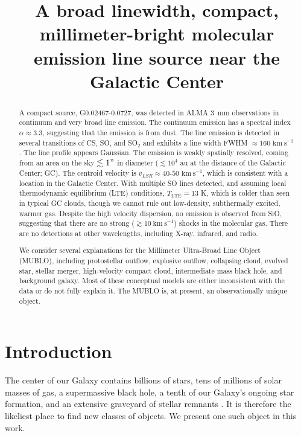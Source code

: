 \documentclass[]{aastex631}
\newcommand{\kms}{\ensuremath{\mathrm{km~s}^{-1}}\xspace}
\newcommand{\threemm}{3~mm\xspace}
\begin{document}
\title{A broad linewidth, compact, millimeter-bright molecular emission line source near the Galactic Center}


\begin{abstract}
A compact source, G0.02467-0.0727, was detected in ALMA \threemm observations in continuum and very broad line emission.
The continuum emission has a spectral index $\alpha\approx3.3$, suggesting that the emission is from dust.
The line emission is detected in several transitions of CS, SO, and SO$_2$ and exhibits a line width FWHM $\approx160$ \kms.
The line profile appears Gaussian.
The emission is weakly spatially resolved, coming from an area on the sky $\lesssim1"$ in diameter ($\lesssim10^4$ au at the distance of the Galactic Center; GC).
The centroid velocity is $v_{LSR}\approx40$-$50$ \kms, which is consistent with a location in the Galactic Center.
With multiple SO lines detected, and assuming local thermodynamic equilibrium (LTE) conditions, $T_\mathrm{LTE} = 13$ K, which is colder than seen in typical GC clouds, though we cannot rule out low-density, subthermally excited, warmer gas.
Despite the high velocity dispersion, no emission is observed from SiO, suggesting that there are no strong ($\gtrsim10~\kms$) shocks in the molecular gas.
There are no detections at other wavelengths, including X-ray, infrared, and radio.

We consider several explanations for the Millimeter Ultra-Broad Line Object (MUBLO), including protostellar outflow, explosive outflow, collapsing cloud, evolved star, stellar merger, high-velocity compact cloud, intermediate mass black hole, and background galaxy.
Most of these conceptual models are either inconsistent with the data or do not fully explain it.
The MUBLO is, at present, an observationally unique object.

\end{abstract}
\section{Introduction}

The center of our Galaxy contains billions of stars, tens of millions of solar masses of gas, a supermassive black hole, a tenth of our Galaxy's ongoing star formation, and an extensive graveyard of stellar remnants \citep[e.g.,][]{Morris1996,Henshaw2023}.
It is therefore the likeliest place to find new classes of objects.
We present one such object in this work.
\end{document}
